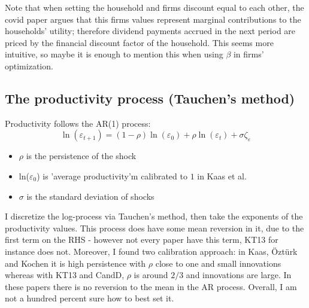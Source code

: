 \documentclass[12pt]{article}
\begin{document}
Note that when setting the household and firms discount equal to each other, the covid paper argues that this firms values represent marginal contributions to the households' utility; therefore dividend payments accrued in the next period are priced by the financial discount factor of the household. This seems more intuitive, so maybe it is enough to mention this when using $\beta$ in firms' optimization.

\subsection*{The productivity process (Tauchen's method)}
Productivity follows the AR(1) process:
$$ \ln(\varepsilon_{t+1}) = (1-\rho) \ln(\varepsilon_0) + \rho \ln(\varepsilon_t) + \sigma \zeta_\varepsilon $$
\begin{itemize}\setlength\itemsep{0em} \small
    \item $\rho$ is the persistence of the shock
    \item ln($\varepsilon_0$) is 'average productivity'm calibrated to $1$ in Kaas et al.
    \item $\sigma$ is the standard deviation of shocks
\end{itemize} \normalsize
I discretize the log-process via Tauchen's method, then take the exponents of the productivity values. This process does have some mean reversion in it, due to the first term on the RHS - however not every paper have this term, KT13 for instance does not. Moreover, I found two calibration approach: in Kaas, Öztürk and Kochen it is high persistence with $\rho$ close to one and small innovations whereas with KT13 and CandD, $\rho$ is around $2/3$ and innovations are large. In these papers there is no reversion to the mean in the AR process. Overall, I am not a hundred percent sure how to best set it. 
\end{document}

